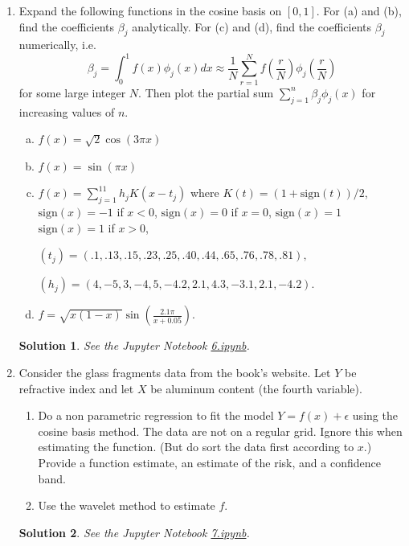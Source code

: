 \documentclass[10pt]{article}
\newtheorem*{sol}{Solution}
\begin{document}
\begin{enumerate}
\item[(6)] Expand the following functions in the cosine basis on $[0, 1]$. For (a)
and (b), find the coefficients $\beta_j$ analytically. For (c) and (d), find the
coefficients $\beta_j$ numerically, i.e.
\[
\beta_j = \int_0^1 f(x)\phi_j(x) dx \approx \frac{1}{N}\sum_{r=1}^N
f\left(\frac{r}{N}\right) \phi_j\left(\frac{r}{N}\right)
\]
for some large integer $N$. Then plot the partial sum $\sum_{j=1}^n\beta_j\phi_j(x)$ for
increasing values of $n$.
\begin{enumerate}[(a)]
\item $f(x) = \sqrt{2}\cos(3\pi x)$
\item $f(x) = \sin(\pi x)$
\item $f(x) = \sum_{j=1}^{11} h_j K(x-t_j)$ where $K(t)=(1+\text{sign}(t))/2$,
$\text{sign}(x)=-1$ if $x<0$, $\text{sign}(x)=0$ if $x=0$, $\text{sign}(x)=1$
$\text{sign}(x)=1$ if $x>0$,

$(t_j) = (.1, .13, .15, .23, .25, .40, .44, .65, .76, .78, .81),$

$(h_j) = (4, -5,3, -4,5, -4.2,2.1,4.3, -3.1,2.1, -4.2)$.
\item $f = \sqrt{x(1-x)}\sin\left(\frac{2.1 \pi}{x + 0.05}\right)$.
\end{enumerate}

\begin{sol}
See the Jupyter Notebook
\href{https://github.com/ajrasmus/some_of_statistics/blob/main/chapter_21/6.ipynb}{6.ipynb}.
\end{sol}

\item[(7)] Consider the glass fragments data from the book's website. Let $Y$ be
refractive index and let $X$ be aluminum content (the fourth variable).
\begin{enumerate}
\item Do a non parametric regression to fit the model $Y = f(x) + \epsilon$ using
the cosine basis method. The data are not on a regular grid. Ignore this
when estimating the function. (But do sort the data first according to
$x$.) Provide a function estimate, an estimate of the risk, and a confidence
band.
\item Use the wavelet method to estimate $f$.
\end{enumerate}

\begin{sol}
See the Jupyter Notebook
\href{https://github.com/ajrasmus/some_of_statistics/blob/main/chapter_21/7.ipynb}{7.ipynb}.
\end{sol}


\end{enumerate}
\end{document}
